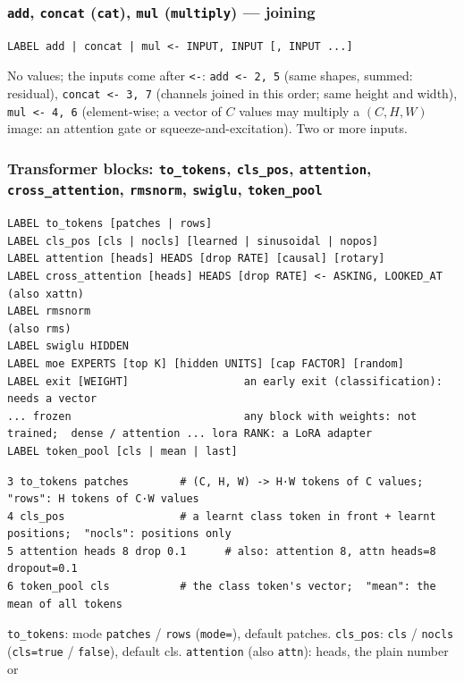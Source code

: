 \subsubsection*{\texttt{add}, \texttt{concat} (\texttt{cat}), \texttt{mul} (\texttt{multiply}) --- joining}
\begin{Verbatim}[fontsize=\small]
LABEL add | concat | mul <- INPUT, INPUT [, INPUT ...]
\end{Verbatim}
No values; the inputs come after \texttt{<-}: \texttt{add <- 2, 5} (same shapes, summed: residual), \texttt{concat <- 3, 7} (channels
joined in this order; same height and width), \texttt{mul <- 4, 6} (element-wise; a vector of $C$ values may multiply a $(C, H, W)$
image: an attention gate or squeeze-and-excitation). Two or more inputs.

\subsubsection*{Transformer blocks: \texttt{to\_tokens}, \texttt{cls\_pos}, \texttt{attention}, \texttt{cross\_attention}, \texttt{rmsnorm},
\texttt{swiglu}, \texttt{token\_pool}}
\begin{Verbatim}[fontsize=\small]
LABEL to_tokens [patches | rows]
LABEL cls_pos [cls | nocls] [learned | sinusoidal | nopos]
LABEL attention [heads] HEADS [drop RATE] [causal] [rotary]
LABEL cross_attention [heads] HEADS [drop RATE] <- ASKING, LOOKED_AT       (also xattn)
LABEL rmsnorm                                                           (also rms)
LABEL swiglu HIDDEN
LABEL moe EXPERTS [top K] [hidden UNITS] [cap FACTOR] [random]
LABEL exit [WEIGHT]                  an early exit (classification): needs a vector
... frozen                           any block with weights: not trained;  dense / attention ... lora RANK: a LoRA adapter
LABEL token_pool [cls | mean | last]
\end{Verbatim}
\begin{verbatim}
3 to_tokens patches        # (C, H, W) -> H·W tokens of C values;  "rows": H tokens of C·W values
4 cls_pos                  # a learnt class token in front + learnt positions;  "nocls": positions only
5 attention heads 8 drop 0.1      # also: attention 8, attn heads=8 dropout=0.1
6 token_pool cls           # the class token's vector;  "mean": the mean of all tokens
\end{verbatim}
\texttt{to\_tokens}: mode \texttt{patches} / \texttt{rows} (\texttt{mode=}), default patches. \texttt{cls\_pos}: \texttt{cls} /
\texttt{nocls} (\texttt{cls=true} / \texttt{false}), default cls. \texttt{attention} (also \texttt{attn}): heads, the plain number or
